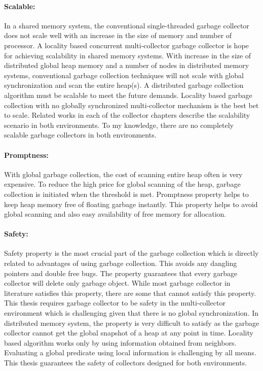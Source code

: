 \paragraph{Scalable:}
In a shared memory system, the conventional single-threaded garbage collector does not scale well with an increase in the size of memory and number of processor. A locality based concurrent multi-collector garbage collector is hope for achieving scalability in shared memory systems.
With increase in the size of distributed global heap memory and  a number of nodes in distributed memory systems, conventional garbage collection techniques will not scale with global synchronization and scan the entire heap(s). A distributed garbage collection algorithm must be scalable to meet the future demands. Locality based garbage collection with no globally synchronized multi-collector mechanism is the best bet to scale. Related works in each of the collector chapters describe the scalability scenario in both environments. To my knowledge, there are no completely scalable garbage collectors in both environments.
\paragraph{Promptness:}
With global garbage collection, the cost of scanning entire heap often is very expensive. To reduce the high price for global scanning of the heap, garbage collection is initiated when the threshold is met. Promptness property helps to keep heap memory free of floating garbage instantly. This property helps to avoid global scanning and also easy availability of free memory for allocation.
\paragraph{Safety:}
Safety property is the most crucial part of the garbage collection which is directly related to advantages of using garbage collection. This avoids any dangling pointers and double free bugs. The property guarantees that every garbage collector will delete only garbage object. While most garbage collector in literature satisfies this property, there are some that cannot satisfy this property. This thesis requires garbage collector to be safety in the multi-collector environment which is challenging given that there is no global synchronization. In distributed memory system, the property is very difficult to satisfy as the garbage collector cannot get the global snapshot of a heap at any point in time. Locality based algorithm works only by using information obtained from neighbors. Evaluating a global predicate using local information is challenging by all means. This thesis guarantees the safety of collectors designed for both environments.
